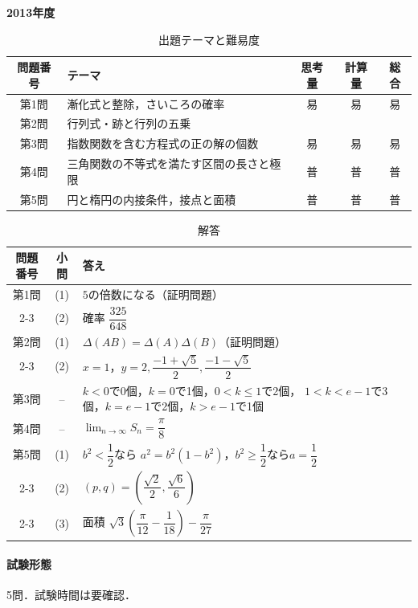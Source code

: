 \documentclass[../../main.tex]{subfiles}
\begin{document}
\begin{center}
  {\fontsize{48pt}{58pt}\selectfont \textbf{2013}\normalsize\textbf{年度}}
\end{center}

\begin{table}[htb]
  \centering
  \caption{出題テーマと難易度}
  \begin{tabular}{|c|p{6.2cm}|c|c|c|}
    \hline
    \textbf{問題番号} & \textbf{テーマ} & \textbf{思考量} & \textbf{計算量} & \textbf{総合} \\
    \hline
    第1問 & 漸化式と整除，さいころの確率 & 易 & 易 & 易 \\
    \hline
    第2問 & 行列式・跡と行列の五乗 &  &  &  \\
    \hline
    第3問 & 指数関数を含む方程式の正の解の個数 & 易 & 易 & 易 \\
    \hline
    第4問 & 三角関数の不等式を満たす区間の長さと極限 & 普 & 普 & 普 \\
    \hline
    第5問 & 円と楕円の内接条件，接点と面積 & 普 & 普 & 普 \\
    \hline
  \end{tabular}
\end{table}

\begin{table}[htb]
  \centering
  \caption{解答}
  \renewcommand{\arraystretch}{1.4}
  \begin{tabular}{|c|c|p{9cm}|}
    \hline
    \textbf{問題番号} & \textbf{小問} & \textbf{答え} \\
    \hline
    第1問 & (1) & $5$の倍数になる（証明問題） \\
    \cline{2-3}
    & (2) & 確率 $\dfrac{325}{648}$ \\
    \hline
    第2問 & (1) & $\Delta(AB)=\Delta(A)\Delta(B)$（証明問題） \\
    \cline{2-3}
    & (2) & $x=1$，$y=2,\dfrac{-1+\sqrt{5}}{2},\dfrac{-1-\sqrt{5}}{2}$ \\
    \hline
    第3問 & -- & $k<0$で0個，$k=0$で1個，$0<k\le1$で2個，
    $1<k<e-1$で3個，$k=e-1$で2個，$k>e-1$で1個 \\
    \hline
    第4問 & -- & $\displaystyle\lim_{n\to\infty}S_n=\dfrac{\pi}{8}$ \\
    \hline
    第5問 & (1) & $b^2<\dfrac{1}{2}$なら
    $a^2=b^2(1-b^2)$，$b^2\ge\dfrac{1}{2}$なら$a=\dfrac{1}{2}$ \\
    \cline{2-3}
    & (2) & $(p,q)=\left(\dfrac{\sqrt{2}}{2},\dfrac{\sqrt{6}}{6}\right)$ \\
    \cline{2-3}
    & (3) & 面積
    $\sqrt{3}\left(\dfrac{\pi}{12}-\dfrac{1}{18}\right)-\dfrac{\pi}{27}$ \\
    \hline
  \end{tabular}
\end{table}

\paragraph{試験形態}
5問．試験時間は要確認．
\end{document}

